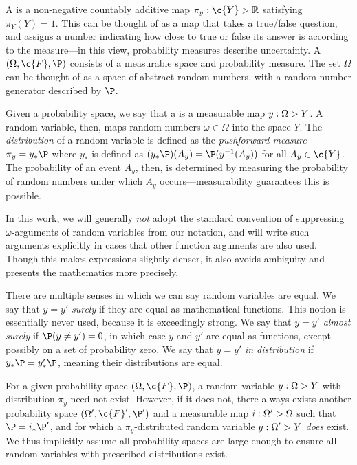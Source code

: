 \documentclass[11pt]{book}
\begin{document}
A  is a non-negative countably additive map $\pi_y : \c{Y} \-> \R$ satisfying $\pi_Y(Y) = 1$. 
This can be thought of as a map that takes a true/false question, and assigns a number indicating how close to true or false its answer is according to the measure---in this view, probability measures describe uncertainty.
A  $(\Omega,\c{F},\P)$ consists of a measurable space and probability measure.
The set $\Omega$ can be thought of as a space of abstract random numbers, with a random number generator described by $\P$.

Given a probability space, we say that a  is a measurable map $y : \Omega \-> Y$.
A random variable, then, maps random numbers $\omega\in\Omega$ into the space $Y$.
The \emph{distribution} of a random variable is defined as the \emph{pushforward measure} $\pi_y = y_* \P$ where $y_*$ is defined as $(y_* \P)(A_y) = \P(y^{-1}(A_y))$ for all $A_y\in\c{Y}$.
The probability of an event $A_y$, then, is determined by measuring the probability of random numbers under which $A_y$ occurs---measurability guarantees this is possible.

In this work, we will generally \emph{not} adopt the standard convention of suppressing $\omega$-arguments of random variables from our notation, and will write such arguments explicitly in cases that other function arguments are also used.
Though this makes expressions slightly denser, it also avoids ambiguity and presents the mathematics more precisely.

There are multiple senses in which we can say random variables are equal.
We say that $y = y'$ \emph{surely} if they are equal as mathematical functions.
This notion is essentially never used, because it is exceedingly strong.
We say that $y = y'$ \emph{almost surely} if $\P(y \neq y') = 0$, in which case $y$ and $y'$ are equal as functions, except possibly on a set of probability zero.
We say that $y = y'$ \emph{in distribution} if $y_* \P = y'_* \P$, meaning their distributions are equal.

For a given probability space $(\Omega,\c{F},\P)$, a random variable $y : \Omega \-> Y$ with distribution $\pi_y$ need not exist.
However, if it does not, there always exists another probability space $(\Omega',\c{F}',\P')$ and a measurable map $i : \Omega' \-> \Omega$ such that $\P = i_* \P'$, and for which a $\pi_y$-distributed random variable $y : \Omega' \-> Y$ \emph{does} exist.
We thus implicitly assume all probability spaces are large enough to ensure all random variables with prescribed distributions exist.
\end{document}
